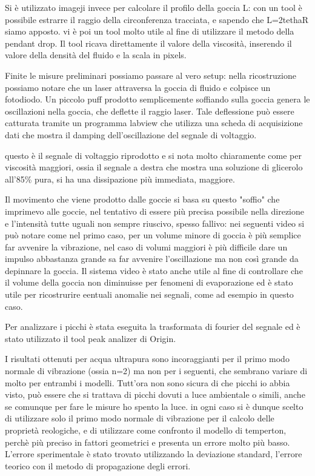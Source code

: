 Si è utilizzato imageji invece per calcolare il profilo della goccia L: con un tool è possibile estrarre il raggio della circonferenza tracciata, e sapendo che L=2tethaR siamo apposto. vi è poi un tool molto utile al fine di utilizzare il metodo della pendant drop. Il tool ricava direttamente il valore della viscosità, inserendo il valore della densità del fluido e la scala in pixels.

Finite le misure preliminari possiamo passare al vero setup: nella ricostruzione possiamo notare che un laser attraversa la goccia di fluido e colpisce un fotodiodo. Un piccolo puff prodotto semplicemente soffiando sulla goccia genera le oscillazioni nella goccia, che deflette il raggio laser. Tale deflessione può essere catturata tramite un programma labview che utilizza una scheda di acquisizione dati che mostra il damping dell'oscillazione del segnale di voltaggio. 

questo è il segnale di voltaggio riprodotto e si nota molto chiaramente come per viscosità maggiori, ossia il segnale a destra che mostra una soluzione di glicerolo all'85\% pura, si ha una dissipazione più immediata, maggiore.

Il movimento che viene prodotto dalle goccie si basa su questo "soffio" che imprimevo alle goccie, nel tentativo di essere più precisa possibile nella direzione e l'intensità tutte uguali non sempre riuscivo, spesso fallivo: nei seguenti video si può notare come nel primo caso, per un volume minore di goccia è più semplice far avvenire la vibrazione, nel caso di volumi maggiori è più difficile dare un impulso abbastanza grande sa far avvenire l'oscillazione ma non così grande da depinnare la goccia. Il sistema video è stato anche utile al fine di controllare che il volume della goccia non diminuisse per fenomeni di evaporazione ed è stato utile per ricostrurire eentuali anomalie nei segnali, come ad esempio in questo caso.

Per analizzare i picchi è stata eseguita la trasformata di fourier del segnale ed è stato utilizzato il tool peak analizer di Origin.

I risultati ottenuti per acqua ultrapura sono incoraggianti per il primo modo normale di vibrazione (ossia n=2) ma non per i seguenti, che sembrano variare di molto per entrambi i modelli. Tutt'ora non sono sicura di che picchi io abbia visto, può essere che si trattava di picchi dovuti a luce ambientale o simili, anche se comunque per fare le misure ho spento la luce. in ogni caso si è dunque scelto di utilizzare solo il primo modo normale di vibrazione per il calcolo delle proprietà reologiche, e di utilizzare come confronto il modello di temperton, perchè più preciso in fattori geometrici e presenta un errore molto più basso. L'errore sperimentale è stato trovato utilizzando la deviazione standard, l'errore teorico con il metodo di propagazione degli errori.

